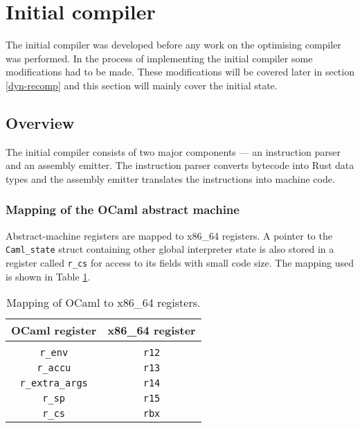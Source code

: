 \section{Initial compiler}

The initial compiler was developed before any work on the optimising compiler was performed. In the
process of implementing the initial compiler some modifications had to be made. These modifications
will be covered later in section \ref{dyn-recomp} and this section will mainly cover the initial
state.

\subsection{Overview}

The initial compiler consists of two major components --- an instruction parser and an assembly
emitter. The instruction parser converts bytecode into Rust data types and the assembly emitter
translates the instructions into machine code.

\subsubsection{Mapping of the OCaml abstract machine}

Abstract-machine registers are mapped to x86\_64 registers. A pointer to the \texttt{Caml\_state}
struct containing other global interpreter state is also stored in a register called \texttt{r\_cs}
for access to its fields with small code size. The mapping used is shown in Table
\ref{table:regmap}.

\begin{table}[h]
      \centering
      \begin{tabular}{cc}\toprule
            OCaml register          & x86\_64 register \\
            \midrule                                   \\
            \texttt{r\_env}         & \texttt{r12}     \\
            \texttt{r\_accu}        & \texttt{r13}     \\
            \texttt{r\_extra\_args} & \texttt{r14}     \\
            \texttt{r\_sp}          & \texttt{r15}     \\
            \texttt{r\_cs}          & \texttt{rbx}     \\
            \bottomrule
      \end{tabular}

      \caption{Mapping of OCaml to x86\_64 registers.}
      \label{table:regmap}
\end{table}

